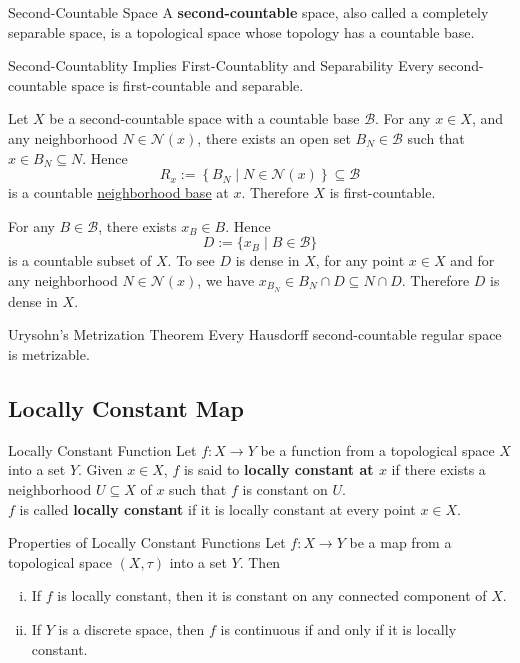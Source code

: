 \documentclass{report}
\begin{document}
\begin{definition}{Second-Countable Space}{}
	A \textbf{second-countable} space, also called a completely separable space, is a topological space whose topology has a countable base.
\end{definition}

\begin{proposition}{Second-Countablity Implies First-Countablity and Separability}{}
	Every second-countable space is first-countable and separable.
\end{proposition}
\begin{prf}
	Let $X$ be a second-countable space with a countable base $\mathcal{B}$. For any $x\in X$, and any neighborhood $N\in\mathcal{N}(x)$, there exists an open set $B_N\in \mathcal{B}$ such that $x\in B_N\subseteq N$. Hence 
	\[  
		R_x:=\left\{B_N \mid N\in\mathcal{N}(x)\right\} \subseteq \mathcal{B}
	\] 
	is a countable \hyperref[th:neighborhood_base]{neighborhood base} at $x$. Therefore $X$ is first-countable.

	For any $B\in\mathcal{B}$, there exists $x_B\in B$. Hence
	\[
		D:=\{x_B\mid B\in\mathcal{B}\}
	\]
	is a countable subset of $X$. To see $D$ is dense in $X$, for any point $x \in X$ and for any neighborhood $N\in\mathcal{N}(x)$, we have $x_{B_N}\in B_N \cap D\subseteq N \cap D $. Therefore $D$ is dense in $X$.
\end{prf}

\begin{theorem}{Urysohn's Metrization Theorem}{}
	Every Hausdorff second-countable regular space is metrizable.
\end{theorem}

\subsection{Locally Constant Map}

\begin{definition}{Locally Constant Function}{}
	Let $f: X \to Y$ be a function from a topological space $X$ into a set $Y$. Given $x \in X$, $f$ is said to \textbf{locally constant at $x$} if there exists a neighborhood $U \subseteq X$ of $x$ such that $f$ is constant on $U$.\\
	$f$ is called \textbf{locally constant} if it is locally constant at every point $x \in X$.
\end{definition}

\begin{proposition}{Properties of Locally Constant Functions}{}
	Let $f: X \to Y$ be a map from a topological space $(X,\tau)$ into a set $Y$. Then
	\begin{enumerate}[(i)]
		\item If $f$ is locally constant, then it is constant on any connected component of $X$.
		\item If $Y$ is a discrete space, then $f$ is continuous if and only if it is locally constant.
	\end{enumerate}
\end{proposition}
\end{document}
